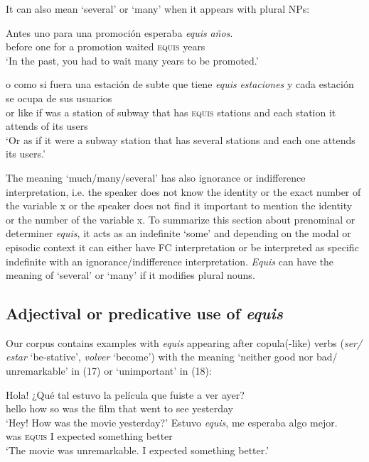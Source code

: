 \documentclass[output=paper
,modfonts
,nonflat]{langsci/langscibook}
\begin{document}
It can also mean ‘several’ or ‘many’ when it appears with plural NPs:

\ea
\gll  Antes uno para una promoción esperaba \textit{equis} \textit{años}.\\
before one for a promotion waited \textsc{equis} years\\
\glt ‘In the past, you had to wait many years to be promoted.’
\z

\ea
\gll  o como si fuera una estación de subte que tiene \textit{equis} \textit{estaciones} y cada estación se ocupa de sus usuarios\\
or like if was a station of subway that has \textsc{equis} stations and each station it attends of its users\\
\glt ‘Or as if it were a subway station that has several stations and each one attends its users.’
\z

The meaning ‘much/many/several’ has also ignorance or indifference interpretation, i.e. the speaker does not know the identity or the exact number of the variable x or the speaker does not find it important to mention the identity or the number of the variable x. 
To summarize this section about prenominal or determiner \textit{equis}, it acts as an indefinite ‘some’ and depending on the modal or episodic context it can either have FC interpretation or be interpreted as specific indefinite with an ignorance/indifference interpretation. \textit{Equis} can have the meaning of ‘several’ or ‘many’ if it modifies plural nouns.

\subsection{Adjectival or predicative use of \textit{equis}}\label{sec:kellert:2.2}
Our corpus contains examples with \textit{equis} appearing after copula(-like) verbs (\textit{ser/ estar} ‘be-stative’, \textit{volver} ‘become’) with the meaning ‘neither good nor bad/ unremarkable’ in (17) or ‘unimportant’ in (18):

\ea
\begin{xlist}
Hola! {¿}Qué tal estuvo la película que fuiste a ver ayer?\\
hello how so was the film that went to see yesterday\\
\glt `Hey! How was the movie yesterday?'
\gll  Estuvo \textit{equis}, me esperaba algo mejor.\\
was \textsc{equis} I expected something better\\
\glt `The movie was unremarkable. I expected something better.’
\end{xlist}
\z
\end{document}
